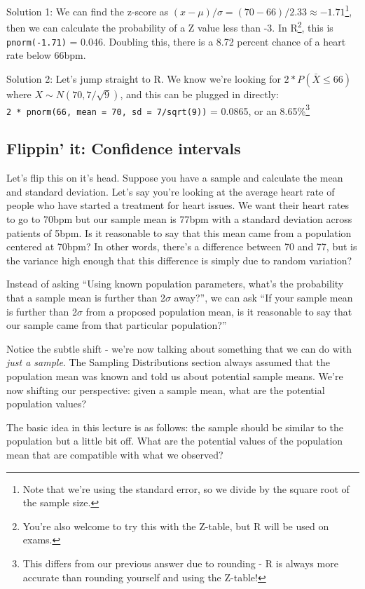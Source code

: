 \documentclass[
  letterpaper,
  DIV=11,
  numbers=noendperiod,
  oneside]{scrreprt}
\begin{document}
Solution 1: We can find the z-score as
\((x-\mu)/\sigma = (70-66)/2.33 \approx -1.71\)\footnote{Note that we're
  using the standard error, so we divide by the square root of the
  sample size.}, then we can calculate the probability of a Z value less
than -3. In R\footnote{You're also welcome to try this with the Z-table,
  but R will be used on exams.}, this is \texttt{pnorm(-1.71)} = 0.046.
Doubling this, there is a 8.72 percent chance of a heart rate below
66bpm.

Solution 2: Let's jump straight to R. We know we're looking for
\(2*P(\bar X \le 66)\) where \(X\sim N(70, 7/\sqrt{9})\), and this can
be plugged in directly:
\texttt{2\ *\ pnorm(66,\ mean\ =\ 70,\ sd\ =\ 7/sqrt(9))} = 0.0865, or
an 8.65\%\footnote{This differs from our previous answer due to rounding
  - R is always more accurate than rounding yourself and using the
  Z-table!}

\hypertarget{flippin-it-confidence-intervals}{%
\subsection{Flippin' it: Confidence
intervals}\label{flippin-it-confidence-intervals}}

Let's flip this on it's head. Suppose you have a sample and calculate
the mean and standard deviation. Let's say you're looking at the average
heart rate of people who have started a treatment for heart issues. We
want their heart rates to go to 70bpm but our sample mean is 77bpm with
a standard deviation across patients of 5bpm. Is it reasonable to say
that this mean came from a population centered at 70bpm? In other words,
there's a difference between 70 and 77, but is the variance high enough
that this difference is simply due to random variation?

Instead of asking ``Using known population parameters, what's the
probability that a sample mean is further than 2\(\sigma\) away?'', we
can ask ``If your sample mean is further than 2\(\sigma\) from a
proposed population mean, is it reasonable to say that our sample came
from that particular population?''

Notice the subtle shift - we're now talking about something that we can
do with \emph{just a sample}. The Sampling Distributions section always
assumed that the population mean was known and told us about potential
sample means. We're now shifting our perspective: given a sample mean,
what are the potential population values?

The basic idea in this lecture is as follows: the sample should be
similar to the population but a little bit off. What are the potential
values of the population mean that are compatible with what we observed?
\end{document}
